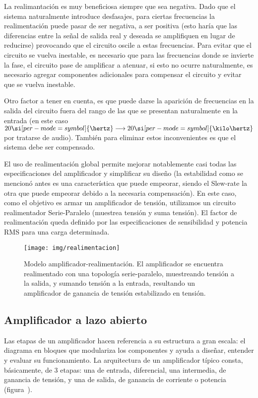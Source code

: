La realimantación es muy beneficiosa siempre que sea negativa. Dado que el sistema naturalmente introduce desfasajes, para ciertas frecuencias la realimentación puede pasar de ser negativa, a ser positiva (esto haría que las diferencias entre la señal de salida real y deseada se amplifiquen en lugar de reducirse) provocando que el circuito oscile a estas frecuencias. Para evitar que el circuito se vuelva inestable, es necesario que para las frecuencias donde se invierte la fase, el circuito pase de amplificar a atenuar, si esto no ocurre naturalmente, es necesario agregar componentes adicionales para compensar el circuito y evitar que se vuelva inestable.

Otro factor a tener en cuenta, es que puede darse la aparición de frecuencias en la salida del circuito fuera del rango de las que se presentan naturalmente en la entrada (en este caso $20 \si[per-mode=symbol]{\hertz} \longrightarrow 20 \si[per-mode=symbol]{\kilo\hertz}$ por tratarse de audio). También para eliminar estos inconvenientes es que el sistema debe ser compensado.

El uso de realimentación global permite mejorar notablemente casi todas las especificaciones del amplificador y simplificar su diseño (la estabilidad como se mencionó antes es una característica que puede empeorar, siendo el Slew-rate la otra que puede empeorar debido a la necesaria compensación). En este caso, como el objetivo es armar un amplificador de tensión, utilizamos un circuito realimentador Serie-Paralelo (muestrea tensión y suma tensión). El factor de realimentación queda definido por las especificaciones de sensibilidad y potencia RMS para una carga determinada.


\begin{figure}[H]
	\centering
	\texttt{[image: img/realimentacion]}
	\caption{Modelo amplificador-realimentación. El amplificador se encuentra realimentado con una topología serie-paralelo, muestreando tensión a la salida, y sumando tensión a la entrada, resultando un amplificador de ganancia de tensión estabilizado en tensión.}
	\label{fig:ampli_feedback_blocks}
\end{figure}


\subsection{Amplificador a lazo abierto}

Las etapas de un amplificador hacen referencia a su estructura a gran escala: el diagrama en bloques que modulariza los componentes y ayuda a diseñar, entender y evaluar su funcionamiento. La arquitectura de un amplificador típico consta, básicamente, de 3 etapas: una de entrada, diferencial, una intermedia, de ganancia de tensión, y una de salida, de ganancia de corriente o potencia (figura~).

